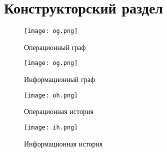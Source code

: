 \section{Конструкторский раздел}

\begin{figure}
    \centering
    \texttt{[image: og.png]}
    \caption{Операционный граф}
    \label{img:og}
\end{figure}

\begin{figure}
    \centering
    \texttt{[image: og.png]}
    \caption{Информационный граф}
    \label{img:ig}
\end{figure}

\begin{figure}
    \centering
    \texttt{[image: oh.png]}
    \caption{Операционная история}
    \label{img:oh}
\end{figure}

\begin{figure}
    \centering
    \texttt{[image: ih.png]}
    \caption{Информационная история}
    \label{img:ih}
\end{figure}


